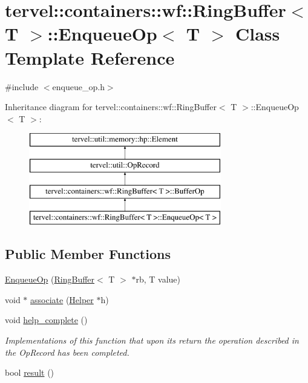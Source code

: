 \hypertarget{classtervel_1_1containers_1_1wf_1_1_ring_buffer_1_1_enqueue_op}{}\section{tervel\+:\+:containers\+:\+:wf\+:\+:Ring\+Buffer$<$ T $>$\+:\+:Enqueue\+Op$<$ T $>$ Class Template Reference}
\label{classtervel_1_1containers_1_1wf_1_1_ring_buffer_1_1_enqueue_op}


{\ttfamily \#include $<$enqueue\+\_\+op.\+h$>$}

Inheritance diagram for tervel\+:\+:containers\+:\+:wf\+:\+:Ring\+Buffer$<$ T $>$\+:\+:Enqueue\+Op$<$ T $>$\+:\begin{figure}[H]
\begin{center}
\leavevmode
\includegraphics[height=4.000000cm]{classtervel_1_1containers_1_1wf_1_1_ring_buffer_1_1_enqueue_op}
\end{center}
\end{figure}
\subsection*{Public Member Functions}
\begin{DoxyCompactItemize}
\item 
\hyperlink{classtervel_1_1containers_1_1wf_1_1_ring_buffer_1_1_enqueue_op_ac3525c0a93c6f9c479b3631645fb6f49}{Enqueue\+Op} (\hyperlink{classtervel_1_1containers_1_1wf_1_1_ring_buffer}{Ring\+Buffer}$<$ T $>$ $\ast$rb, T value)
\item 
void $\ast$ \hyperlink{classtervel_1_1containers_1_1wf_1_1_ring_buffer_1_1_enqueue_op_a746cece514a2d8189bad01c04a1cf00c}{associate} (\hyperlink{classtervel_1_1containers_1_1wf_1_1_ring_buffer_1_1_helper}{Helper} $\ast$h)
\item 
void \hyperlink{classtervel_1_1containers_1_1wf_1_1_ring_buffer_1_1_enqueue_op_a928f562593a93be6c99df05c128012b8}{help\+\_\+complete} ()
\begin{DoxyCompactList}\small\item\em Implementations of this function that upon its return the operation described in the Op\+Record has been completed. \end{DoxyCompactList}\item 
bool \hyperlink{classtervel_1_1containers_1_1wf_1_1_ring_buffer_1_1_enqueue_op_abb16cd7e84e8d3d1ffe1f25a400ac36c}{result} ()
\end{DoxyCompactItemize}
